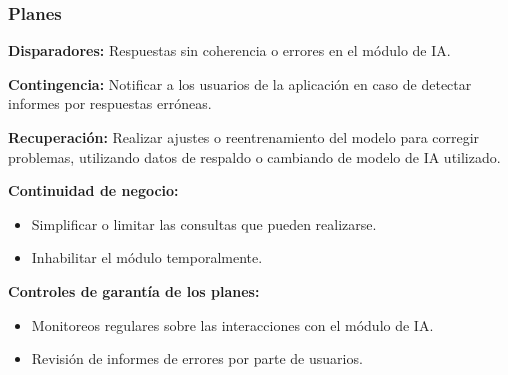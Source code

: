 \documentclass[a4paper,12pt]{article}
\begin{document}
    \subsubsection{Planes}
    \par \textbf{Disparadores:} Respuestas sin coherencia o errores en el módulo de IA.
    \par \textbf{Contingencia:} Notificar a los usuarios de la aplicación en caso de detectar informes por respuestas erróneas.
    \par \textbf{Recuperación:} Realizar ajustes o reentrenamiento del modelo para corregir problemas, utilizando datos de respaldo o cambiando de modelo de IA utilizado.
    \par \textbf{Continuidad de negocio:}
    \begin{itemize}
        \item Simplificar o limitar las consultas que pueden realizarse.
        \item Inhabilitar el módulo temporalmente.
    \end{itemize}
    \par \textbf{Controles de garantía de los planes:}
    \begin{itemize}
        \item Monitoreos regulares sobre las interacciones con el módulo de IA.
        \item Revisión de informes de errores por parte de usuarios.
    \end{itemize}




    \newpage

    \printbibliography[heading=bibintoc]
\end{document}
